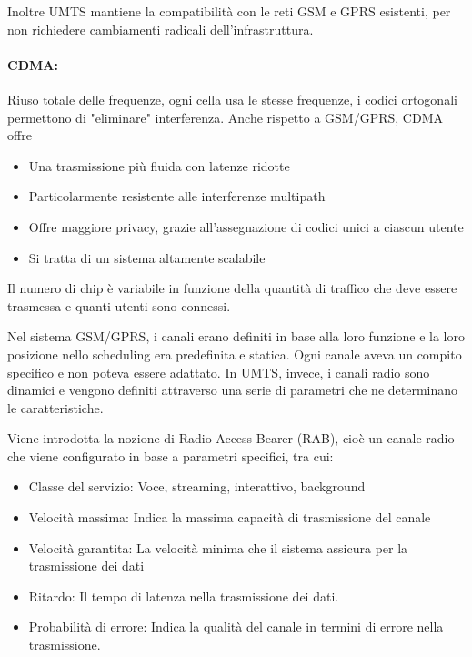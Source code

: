 Inoltre UMTS mantiene la compatibilità con le reti GSM e GPRS esistenti, per non richiedere cambiamenti radicali dell'infrastruttura.

\paragraph{CDMA:} Riuso totale delle frequenze, ogni cella usa le stesse frequenze, i codici ortogonali permettono di "eliminare" interferenza. Anche rispetto a GSM/GPRS, CDMA offre 
\begin{itemize}
    \item Una trasmissione più fluida con latenze ridotte
    
    \item Particolarmente resistente alle interferenze multipath
    
    \item Offre maggiore privacy, grazie all'assegnazione di codici unici a ciascun utente

    \item Si tratta di un sistema altamente scalabile
\end{itemize}

Il numero di chip è variabile in funzione della quantità di traffico che deve essere trasmessa e quanti utenti sono connessi.

Nel sistema GSM/GPRS, i canali erano definiti in base alla loro funzione e la loro posizione nello scheduling era predefinita e statica. Ogni canale aveva un compito specifico e non poteva essere adattato.  In UMTS, invece, i canali radio sono dinamici e vengono definiti attraverso una serie di parametri che ne determinano le caratteristiche. 

Viene introdotta la nozione di Radio Access Bearer (RAB), cioè un canale radio che viene configurato in base a parametri specifici, tra cui:
\begin{itemize}
	\item Classe del servizio: Voce, streaming, interattivo, background

	\item Velocità massima: Indica la massima capacità di trasmissione del canale

	\item Velocità garantita: La velocità minima che il sistema assicura per la trasmissione dei dati

	\item Ritardo: Il tempo di latenza nella trasmissione dei dati.

	\item Probabilità di errore: Indica la qualità del canale in termini di errore nella trasmissione.
\end{itemize}


